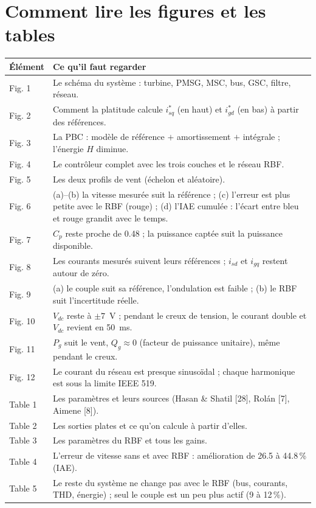 \documentclass[11pt,a4paper]{article}
\begin{document}
\section{Comment lire les figures et les tables}
\begin{longtable}{@{}p{2.2cm}p{12.6cm}@{}}
\toprule
Élément & Ce qu'il faut regarder\\
\midrule
\endhead
Fig. 1 & Le schéma du système : turbine, PMSG, MSC, bus, GSC, filtre, réseau.\\
Fig. 2 & Comment la platitude calcule $i_{sq}^*$ (en haut) et $i_{gd}^*$ (en bas) à partir des références.\\
Fig. 3 & La PBC : modèle de référence $+$ amortissement $+$ intégrale ; l'énergie $H$ diminue.\\
Fig. 4 & Le contrôleur complet avec les trois couches et le réseau RBF.\\
Fig. 5 & Les deux profils de vent (échelon et aléatoire).\\
Fig. 6 & (a)--(b) la vitesse mesurée suit la référence ; (c) l'erreur est plus petite avec le RBF (rouge) ;
(d) l'IAE cumulée : l'écart entre bleu et rouge grandit avec le temps.\\
Fig. 7 & $C_p$ reste proche de 0.48 ; la puissance captée suit la puissance disponible.\\
Fig. 8 & Les courants mesurés suivent leurs références ; $i_{sd}$ et $i_{gq}$ restent autour de zéro.\\
Fig. 9 & (a) le couple suit sa référence, l'ondulation est faible ; (b) le RBF suit l'incertitude réelle.\\
Fig. 10 & $V_{dc}$ reste à $\pm7$~V ; pendant le creux de tension, le courant double et $V_{dc}$ revient en 50~ms.\\
Fig. 11 & $P_g$ suit le vent, $Q_g\approx0$ (facteur de puissance unitaire), même pendant le creux.\\
Fig. 12 & Le courant du réseau est presque sinusoïdal ; chaque harmonique est sous la limite IEEE 519.\\
Table 1 & Les paramètres et leurs sources (Hasan \& Shatil [28], Rolán [7], Aimene [8]).\\
Table 2 & Les sorties plates et ce qu'on calcule à partir d'elles.\\
Table 3 & Les paramètres du RBF et tous les gains.\\
Table 4 & L'erreur de vitesse sans et avec RBF : amélioration de 26.5 à 44.8\,\% (IAE).\\
Table 5 & Le reste du système ne change pas avec le RBF (bus, courants, THD, énergie) ; seul le couple est
un peu plus actif (9 à 12\,\%).\\
\bottomrule
\end{longtable}
\end{document}
